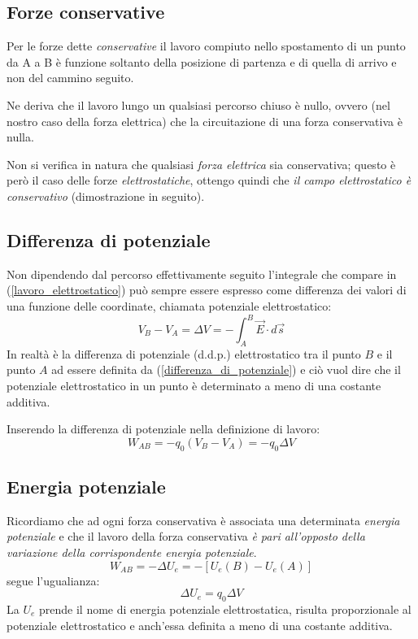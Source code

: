 \documentclass[class=book, crop=false, oneside, 12pt]{standalone}
\begin{document}
\subsection{Forze conservative}
Per le forze dette \emph{conservative} il lavoro compiuto nello spostamento di un punto da A a B è funzione soltanto della posizione di partenza e di quella di arrivo e non del cammino seguito.

Ne deriva che il lavoro lungo un qualsiasi percorso chiuso è nullo, ovvero (nel nostro caso della forza elettrica) che la circuitazione di una forza conservativa è nulla.

Non si verifica in natura che qualsiasi \emph{forza elettrica} sia conservativa; questo è però il caso delle forze \emph{elettrostatiche}, ottengo quindi che \emph{il campo elettrostatico è conservativo} (dimostrazione in seguito).

\subsection*{Differenza di potenziale}

Non dipendendo dal percorso effettivamente seguito l'integrale che compare in (\ref{lavoro_elettrostatico}) può sempre essere espresso come differenza dei valori di una funzione delle coordinate, chiamata potenziale elettrostatico: 
\begin{equation} \label{differenza_di_potenziale}
    V_B - V_A = \Delta V = - \int_A^B \overrightarrow{E} \cdot d \overrightarrow{s}
\end{equation}
In realtà è la differenza di potenziale (d.d.p.) elettrostatico tra il punto \(B\) e il punto \(A\) ad essere definita da (\ref{differenza_di_potenziale}) e ciò vuol dire che il potenziale elettrostatico in un punto è determinato a meno di una costante additiva.

Inserendo la differenza di potenziale nella definizione di lavoro:
\begin{equation}
    W_{AB} = -q_0 \left(V_B - V_A\right) = -q_0 \Delta V
\end{equation}

\subsection*{Energia potenziale}

Ricordiamo che ad ogni forza conservativa è associata una determinata \emph{energia potenziale} e che il lavoro della forza  conservativa \emph{è pari all'opposto della variazione della corrispondente energia potenziale}.
\begin{equation*}
    W_{AB} = - \Delta U_e = - \left[U_e (B) - U_e (A)\right]
\end{equation*}
segue l'ugualianza:
\begin{equation}
    \Delta U_e = q_0 \Delta V
\end{equation}
La \(U_e\) prende il nome di energia potenziale elettrostatica, risulta proporzionale al potenziale elettrostatico e anch'essa definita a meno di una costante additiva. 
\end{document}
